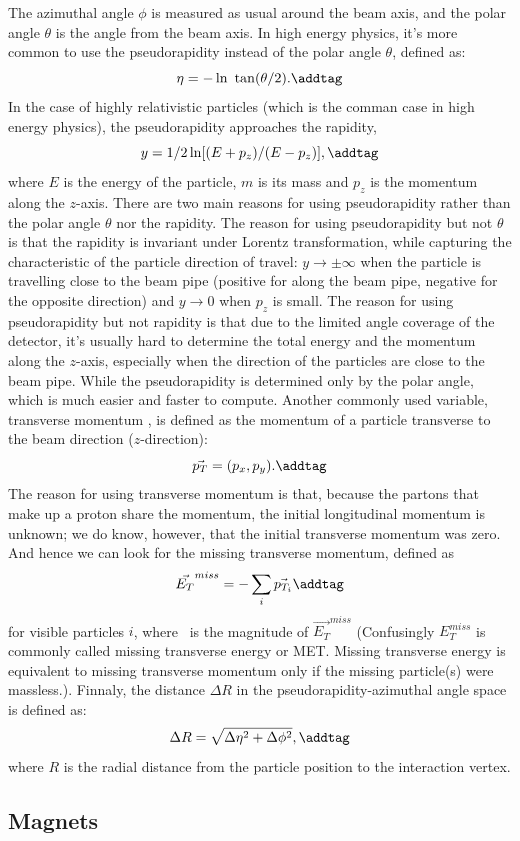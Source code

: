 The azimuthal angle $\phi$ 	is measured as usual around the beam axis, 
and the polar angle $\theta$ is the angle from the beam axis.  
In high energy physics, it's more common to use the 
pseudorapidity instead of the polar angle $\theta$, defined as:
\[
		\eta = -\ln\ \tan(\theta/2). 
 \addtag \]
In the case of highly relativistic particles
(which is the comman case in high energy physics), 
the pseudorapidity approaches the rapidity, 
\[ 
	y=1/2\ln[(E+p_z)/(E-p_z)], 
 \addtag \]
where $E$ is the energy of the particle, $m$ is its mass 
and $p_z$ is the momentum along the $z$-axis.
There are two main reasons for using pseudorapidity 
rather than the polar angle $\theta$ nor the rapidity.
The reason for using pseudorapidity but not $\theta$ 
is that the rapidity is invariant
under Lorentz transformation, while capturing 
the characteristic of the particle direction of travel:
$y \rightarrow \pm \infty $ when the particle is  
travelling close to the beam pipe (positive for along the
beam pipe, negative for the opposite direction) and
$y \rightarrow 0$ when $p_z$ is small.
The reason for using pseudorapidity but not rapidity
is that due to the limited angle coverage of the detector, 
it's usually hard to determine the total energy and the momentum 
along the $z$-axis, especially when the direction of 
the particles are close to the beam pipe. 
While the pseudorapidity is determined only by
the polar angle, which is much easier and faster 
to compute. 
Another commonly used variable, transverse momentum \pt, 
is defined as the momentum of a particle transverse to the 
beam direction ($z$-direction):
\[ 
	\vec{p_T}= (p_x,p_y).
 \addtag \]
The reason for using transverse momentum 
is that, because the partons that make up a proton share the momentum,
the initial longitudinal momentum is unknown;	
we do know, however, that the initial transverse momentum was zero. 
And hence we can look for the missing transverse momentum, defined
as 
\[ 
	\vec{E_T}^{miss}=-\sum_i \vec{p_{T_i}} \label{eq:MET}
 \addtag \]
for visible particles $i$, where \met\ is the magnitude of $\vec{E_T}^{miss}$
 (Confusingly $E_T^{miss}$ is commonly called 
missing transverse energy or MET. Missing transverse energy is equivalent 
to missing transverse momentum only if the missing particle(s) were massless.). 
Finnaly, the distance $\Delta R$ in the pseudorapidity-azimuthal angle 
space is defined as:
\[\Delta R = \sqrt{\Delta \eta^2+\Delta\phi^2}, \addtag \]
where $R$ is the radial distance from the particle position to the interaction 
vertex.

\subsection{Magnets}


